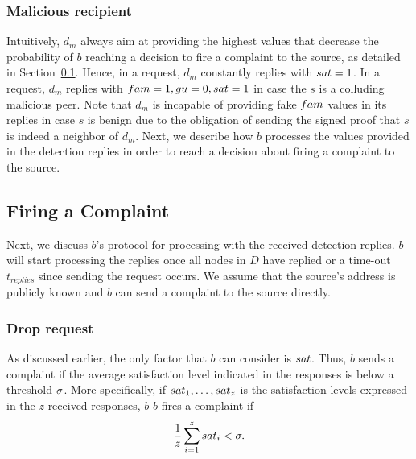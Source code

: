 \subsubsection*{Malicious recipient}


Intuitively, $d_m$ always aim at providing the highest values that decrease the probability of $b$ reaching a decision to fire a complaint to the source, as detailed in Section~\ref{Firing_a_Complain}.
Hence, in a \drop request, $d_m$ constantly replies with $sat=1$.
In a \manp request, $d_m$ replies with $fam=1, gu=0, sat=1$ in case the $s$ is a colluding malicious peer.
Note that $d_m$ is incapable of providing fake $fam$ values in its replies in case $s$ is benign due to the obligation of sending the signed proof that $s$ is indeed a neighbor of $d_m$. 
Next, we describe how $b$ processes the values provided in the detection replies in order to reach a decision about firing a complaint to the source.

\subsection{Firing a Complaint}
\label{Firing_a_Complain}
Next, we discuss $b$'s protocol for processing with the received detection replies. $b$ will start processing the replies once all nodes in $D$ have replied or a time-out $t_{replies}$ since sending the request occurs. 
We assume that the source's address is publicly known and $b$ can send a complaint to the source directly.
\subsubsection*{Drop request}
As discussed earlier, the only factor that $b$ can consider is $sat$. Thus, $b$ sends a complaint if the average satisfaction level indicated in the responses is below a threshold $\sigma$.
More specifically, if $sat_1, \ldots , sat_z$ is the satisfaction levels expressed in the $z$ received responses, $b$
$b$ fires a complaint if 
\begin{align}
\label{eq:drop_satis_equation}
\frac{1}{z}\sum_{i=1}^{z} \sat_i< \satThres. 
\end{align} 

